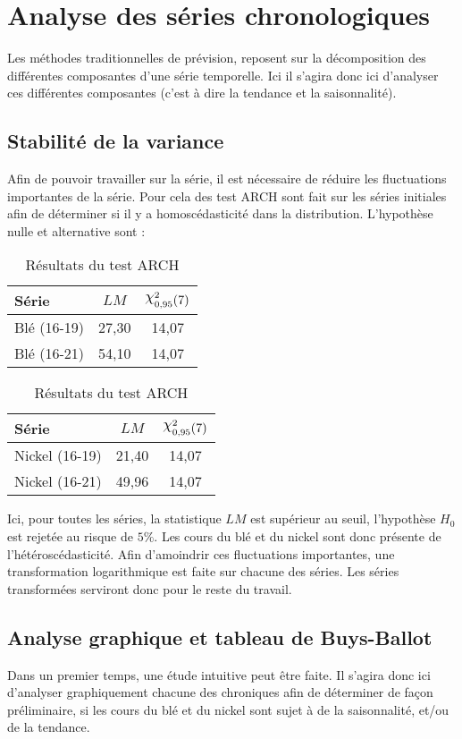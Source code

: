 \section{Analyse des séries chronologiques}
Les méthodes traditionnelles de prévision, reposent sur la décomposition des différentes composantes d'une série temporelle. Ici il s'agira donc
ici d'analyser ces différentes composantes (c'est à dire la tendance et la saisonnalité).
\subsection{Stabilité de la variance}
Afin de pouvoir travailler sur la série, il est nécessaire de réduire les 
fluctuations importantes de la série. Pour cela des test ARCH sont fait sur les 
séries initiales afin de déterminer si il y a homoscédasticité dans la distribution. L'hypothèse nulle et alternative sont :
\begin{table}[H]
    \centering
    {\sffamily
    \begin{tabular}{lcc}
        \toprule
        Série           &  $LM$ & $\rchi^{2}_{0,95} (7)$\\
        \midrule
        Blé (16-19)     & 27,30     & 14,07 \\ 
        Blé (16-21)     & 54,10     & 14,07\\
        \bottomrule
    \end{tabular}
    \begin{tabular}{lcc}
        \toprule
        Série           &  $LM$ & $\rchi^{2}_{0,95} (7)$\\
        \midrule
        Nickel (16-19)  & 21,40     & 14,07\\
        Nickel (16-21)  & 49,96     & 14,07\\
        \bottomrule
    \end{tabular}}
    \caption{Résultats du test ARCH}
\end{table}
Ici, pour toutes les séries, la statistique $LM$ est supérieur au seuil, l'hypothèse $H_{0}$ est 
rejetée au risque de $5\%$. Les cours du blé et du nickel sont donc présente de l'hétéroscédasticité. Afin d'amoindrir ces fluctuations importantes, une transformation 
logarithmique est faite sur chacune des séries. Les séries transformées serviront donc
pour le reste du travail.

\subsection{Analyse graphique et tableau de Buys-Ballot}\label{graph}
Dans un premier temps, une étude intuitive peut être faite. Il s'agira donc ici d'analyser graphiquement chacune des chroniques afin 
de déterminer de façon préliminaire, si les cours du blé et du nickel sont sujet à de la saisonnalité, et/ou de la tendance.


